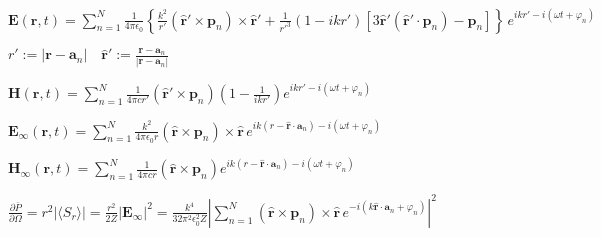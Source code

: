 \documentclass[multi={mymath},border=1pt,convert={density=300,outext=.png}]{standalone}
\newenvironment{mymath}{$\displaystyle}{$}
\begin{document}
\pagecolor[RGB]{255,255,255} %

\newcommand{\norm}[1]{\left|#1\right|}

\begin{mymath}
\mathbf{E}(\mathbf{r}, t) = \sum_{n=1}^{N}\frac{1}{4\pi\epsilon_{0}}\left\{ \frac{k^{2}}{r'}(\mathbf{\hat{r}'} \times \mathbf{p}_{n}) \times \mathbf{\hat{r}'} + \frac{1}{r'^{3}}(1-ikr')\left[3\mathbf{\hat{r}'}(\mathbf{\hat{r}'}\cdot\mathbf{p}_{n}) - \mathbf{p}_{n}\right]\right\}\,e^{ikr' - i(\omega t + \varphi_{n})}
\end{mymath}

\begin{mymath}
r' := |\mathbf{r} - \mathbf{a}_{n}|\quad\mathbf{\hat{r}'} := \frac{\mathbf{r} - \mathbf{a}_{n}}{|\mathbf{r} - \mathbf{a}_{n}|}
\end{mymath}

\begin{mymath}
\mathbf{H}(\mathbf{r}, t) = \sum_{n=1}^{N}\frac{1}{4\pi c r'} (\mathbf{\hat{r}'} \times \mathbf{p}_{n}) \left (1 - \frac{1}{ikr'}\right) e^{ikr' - i(\omega t + \varphi_{n})}
\end{mymath}


\begin{mymath}
\mathbf{E}_{\infty}(\mathbf{r}, t) = \sum_{n=1}^{N}\frac{k^{2}}{4\pi\epsilon_{0}r} (\mathbf{\hat{r}} \times \mathbf{p}_{n}) \times \mathbf{\hat{r}}\,e^{ik(r - \mathbf{\hat{r}}\cdot\mathbf{a}_{n}) - i(\omega t + \varphi_{n})}
\end{mymath}

\begin{mymath}
\mathbf{H}_\infty(\mathbf{r}, t) = \sum_{n=1}^{N}\frac{1}{4\pi c r} (\mathbf{\hat{r}} \times \mathbf{p}_{n}) e^{ik(r - \mathbf{\hat{r}}\cdot\mathbf{a}_n) - i(\omega t + \varphi_{n})}
\end{mymath}


\begin{mymath}
  \frac{\partial \overline{P}}{\partial \Omega} = r^{2} |\langle S_{r} \rangle| = \frac{r^{2}}{2Z} \norm{\mathbf{E}_{\infty}}^{2} = \frac{k^{4}}{32\pi^{2}\epsilon_{0}^{2}Z} \norm{\sum_{n=1}^{N} (\mathbf{\hat{r}} \times \mathbf{p}_{n}) \times \mathbf{\hat{r}}\, e^{- i(k\mathbf{\hat{r}}\cdot\mathbf{a}_{n} + \varphi_{n})}}^{2}
\end{mymath}
\end{document}
